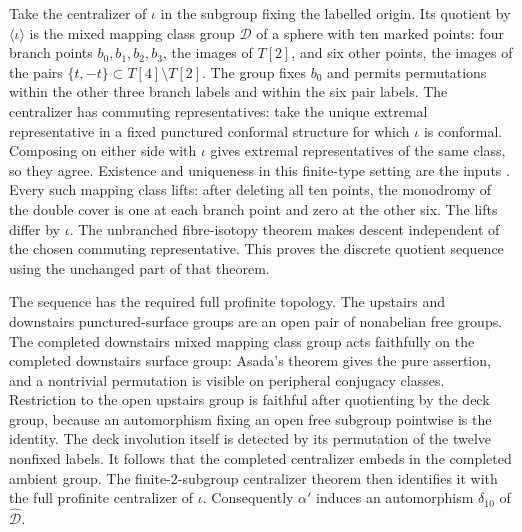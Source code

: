 Take the centralizer of \(\iota\) in the subgroup fixing the
labelled origin. Its quotient by \(\langle\iota\rangle\) is
the mixed mapping class group \(\mathcal D\) of a sphere
with ten marked points: four branch points \(b_0,b_1,b_2,b_3\),
the images of \(T[2]\), and six other points, the images of
the pairs \(\{t,-t\}\subset T[4]\setminus T[2]\).
The group fixes \(b_0\) and permits permutations within the
other three branch labels and within the six pair labels.
The centralizer has commuting representatives: take the
unique extremal representative in a fixed punctured conformal
structure for which \(\iota\) is conformal. Composing on
either side with \(\iota\) gives extremal representatives
of the same class, so they agree. Existence and uniqueness
in this finite-type setting are the inputs
\cite[Sections~5 and~8, Theorems~1 and~6]{CubicGH}.
Every such mapping class lifts: after deleting all ten
points, the monodromy of the double cover is one at each
branch point and zero at the other six. The lifts differ
by \(\iota\). The unbranched fibre-isotopy theorem
\cite[Theorem~1]{CubicBH} makes descent independent of the
chosen commuting representative. This proves the discrete
quotient sequence using the unchanged part of that theorem.

The sequence has the required full profinite topology.
The upstairs and downstairs punctured-surface groups are
an open pair of nonabelian free groups. The completed
downstairs mixed mapping class group acts faithfully on the
completed downstairs surface group: Asada's theorem
\cite[introduction Theorem, (i)--(ii)]{CubicAsada} gives
the pure assertion, and a nontrivial permutation is visible
on peripheral conjugacy classes. Restriction to the open
upstairs group is faithful after quotienting by the deck
group, because an automorphism fixing an open free subgroup
pointwise is the identity. The deck involution itself is
detected by its permutation of the twelve nonfixed labels.
It follows that the completed centralizer embeds in the
completed ambient group. The finite-\(2\)-subgroup
centralizer theorem then identifies it with the full
profinite centralizer of \(\iota\).
Consequently \(\alpha'\) induces an automorphism
\(\delta_{10}\) of \(\widehat{\mathcal D}\).

